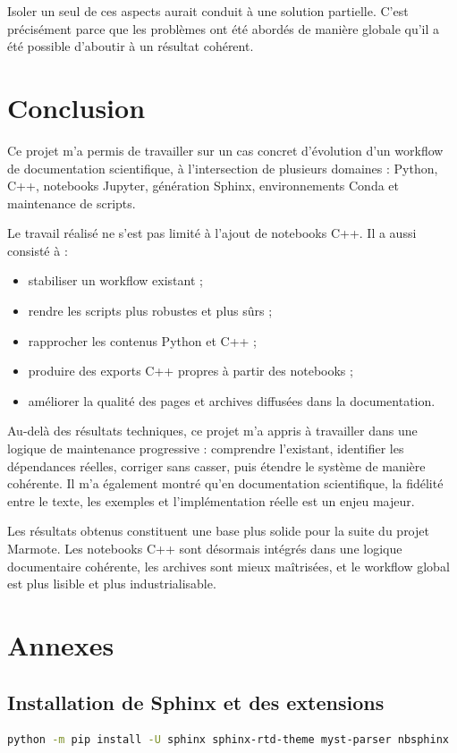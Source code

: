 \documentclass[a4paper,12pt,twoside]{article}
\begin{document}
Isoler un seul de ces aspects aurait conduit à une solution partielle. C'est précisément parce que les problèmes ont été abordés de manière globale qu'il a été possible d'aboutir à un résultat cohérent.

\section{Conclusion}

Ce projet m'a permis de travailler sur un cas concret d'évolution d'un workflow de documentation scientifique, à l'intersection de plusieurs domaines : Python, C++, notebooks Jupyter, génération Sphinx, environnements Conda et maintenance de scripts.

Le travail réalisé ne s'est pas limité à l'ajout de notebooks C++. Il a aussi consisté à :
\begin{itemize}
    \item stabiliser un workflow existant ;
    \item rendre les scripts plus robustes et plus sûrs ;
    \item rapprocher les contenus Python et C++ ;
    \item produire des exports C++ propres à partir des notebooks ;
    \item améliorer la qualité des pages et archives diffusées dans la documentation.
\end{itemize}

Au-delà des résultats techniques, ce projet m'a appris à travailler dans une logique de maintenance progressive : comprendre l'existant, identifier les dépendances réelles, corriger sans casser, puis étendre le système de manière cohérente. Il m'a également montré qu'en documentation scientifique, la fidélité entre le texte, les exemples et l'implémentation réelle est un enjeu majeur.

Les résultats obtenus constituent une base plus solide pour la suite du projet Marmote. Les notebooks C++ sont désormais intégrés dans une logique documentaire cohérente, les archives sont mieux maîtrisées, et le workflow global est plus lisible et plus industrialisable.

\appendix
\section{Annexes}

\subsection{Installation de Sphinx et des extensions}
\label{annexe:sphinx-install}
\begin{lstlisting}[language=bash,caption={Installation de Sphinx et des extensions utiles.}]
python -m pip install -U sphinx sphinx-rtd-theme myst-parser nbsphinx
\end{lstlisting}
\end{document}
